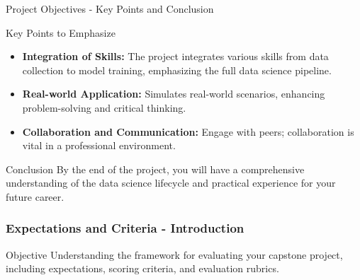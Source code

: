 \documentclass[aspectratio=169]{beamer}
\begin{document}
\begin{frame}[fragile]{Project Objectives - Key Points and Conclusion}
    \begin{block}{Key Points to Emphasize}
        \begin{itemize}
            \item \textbf{Integration of Skills:} The project integrates various skills from data collection to model training, emphasizing the full data science pipeline.
            \item \textbf{Real-world Application:} Simulates real-world scenarios, enhancing problem-solving and critical thinking.
            \item \textbf{Collaboration and Communication:} Engage with peers; collaboration is vital in a professional environment.
        \end{itemize}
    \end{block}

    \begin{block}{Conclusion}
        By the end of the project, you will have a comprehensive understanding of the data science lifecycle and practical experience for your future career.
    \end{block}
\end{frame}

\begin{frame}[fragile]
    \frametitle{Expectations and Criteria - Introduction}
    \begin{block}{Objective}
        Understanding the framework for evaluating your capstone project, including expectations, scoring criteria, and evaluation rubrics.
    \end{block}
\end{frame}
\end{document}
